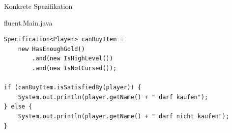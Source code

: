 \begin{frame}[fragile]{Konkrete Spezifikation}
	\begin{exampleblock}{fluent.Main.java}
		\begin{lstlisting}
Specification<Player> canBuyItem =
    new HasEnoughGold()
        .and(new IsHighLevel())
        .and(new IsNotCursed());

if (canBuyItem.isSatisfiedBy(player)) {
    System.out.println(player.getName() + " darf kaufen");
} else {
	System.out.println(player.getName() + " darf nicht kaufen");
}
		\end{lstlisting}
	\end{exampleblock}
\end{frame}
